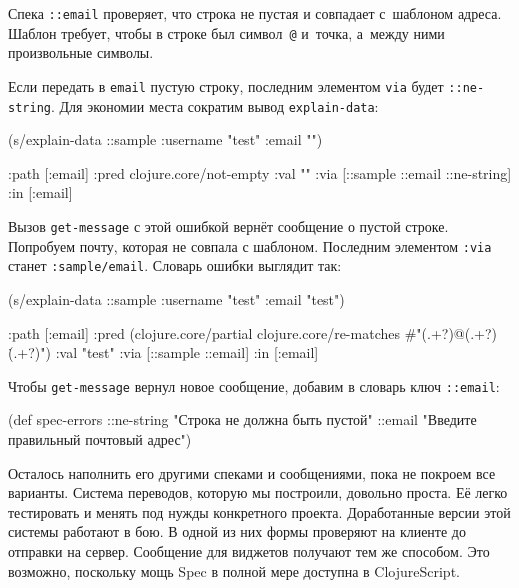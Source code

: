 Спека \verb|::email| проверяет, что строка не пустая и совпадает с~шаблоном
адреса. Шаблон требует, чтобы в строке был символ~\verb|@| и~точка, а~между
ними произвольные символы.

Если передать в \verb|email| пустую строку, последним элементом \verb|via|
будет \verb|::ne-string|. Для экономии места сократим вывод
\verb|explain-data|:

\begin{english}
  \begin{clojure}
(s/explain-data ::sample {:username "test" :email ""})

{:path [:email]
 :pred clojure.core/not-empty
 :val ""
 :via [::sample ::email ::ne-string]
 :in [:email]}
  \end{clojure}
\end{english}

Вызов \verb|get-message| с этой ошибкой вернёт сообщение о пустой
строке. Попробуем почту, которая не совпала с шаблоном. Последним элементом
\verb|:via| станет \verb|:sample/email|. Словарь ошибки выглядит так:

\begin{english}
  \begin{clojure}
(s/explain-data ::sample {:username "test" :email "test"})

{:path [:email]
 :pred
 (clojure.core/partial
  clojure.core/re-matches
  #"(.+?)@(.+?)\.(.+?)")
 :val "test"
 :via [::sample ::email]
 :in [:email]}
  \end{clojure}
\end{english}

Чтобы \verb|get-message| вернул новое сообщение, добавим в словарь ключ
\verb|::email|:

  \begin{clojure}
(def spec-errors
  {::ne-string "Строка не должна быть пустой"
   ::email "Введите правильный почтовый адрес"})
  \end{clojure}


Осталось наполнить его другими спеками и сообщениями, пока не покроем все
варианты. Система переводов, которую мы построили, довольно проста. Её легко
тестировать и менять под нужды конкретного проекта. Доработанные версии этой
системы работают в бою. В одной из них формы проверяют на клиенте до отправки на
сервер. Сообщение для виджетов получают тем же способом. Это возможно, поскольку
мощь Spec в полной мере доступна в ClojureScript.


